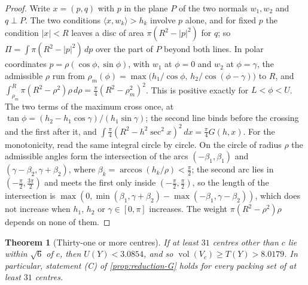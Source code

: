 \documentclass[11pt,reqno]{amsart}
\renewcommand{\_}{\origunderscore\allowbreak}
\numberwithin{equation}{section}
\theoremstyle{plain}
\newtheorem{thm}{Theorem}[section]
\theoremstyle{definition}
\theoremstyle{remark}
\DeclareMathOperator{\vol}{vol}
\begin{document}
\begin{proof}
Write $x=(p,q)$ with $p$ in the plane $P$ of the two normals $w_1,w_2$ and
$q\perp P$. The two conditions $\langle x,w_k\rangle>h_k$ involve $p$ alone,
and for fixed $p$ the condition $|x|<R$ leaves a disc of area
$\pi(R^2-|p|^2)$ for $q$; so $\Pi=\int\pi(R^2-|p|^2)\,dp$ over the part of
$P$ beyond both lines. In polar coordinates $p=\rho(\cos\phi,\sin\phi)$,
with $w_1$ at $\phi=0$ and $w_2$ at $\phi=\gamma$, the admissible $\rho$ run
from $\rho_m(\phi)=\max\bigl(h_1/\cos\phi,\,h_2/\cos(\phi-\gamma)\bigr)$ to
$R$, and $\int_{\rho_m}^R\pi(R^2-\rho^2)\rho\,d\rho=\frac\pi4(R^2-\rho_m^2)^2$.
This is positive exactly for $L<\phi<U$. The two terms of the maximum cross
once, at $\tan\phi=(h_2-h_1\cos\gamma)/(h_1\sin\gamma)$; the second line
binds before the crossing and the first after it, and
$\int\frac\pi4(R^2-h^2\sec^2x)^2\,dx=\frac\pi4G(h,x)$. For the monotonicity,
read the same integral circle by circle. On the circle of radius $\rho$ the
admissible angles form the intersection of the arcs
$(-\beta_1,\beta_1)$ and $(\gamma-\beta_2,\gamma+\beta_2)$, where
$\beta_k=\arccos(h_k/\rho)<\frac\pi2$; the second arc lies in
$(-\frac\pi2,\frac{3\pi}2)$ and meets the first only inside
$(-\frac\pi2,\frac\pi2)$, so the length of the intersection is
$\max(0,\min(\beta_1,\gamma+\beta_2)-\max(-\beta_1,\gamma-\beta_2))$, which
does not increase when $h_1$, $h_2$ or $\gamma\in[0,\pi]$ increases. The
weight $\pi(R^2-\rho^2)\rho$ depends on none of them.
\end{proof}

\begin{thm}[Thirty-one or more centres]\label{thm:count31}
If at least $31$ centres other than $c$ lie within $\sqrt6$ of $c$, then
$U(Y)<3.0854$, and so $\vol(V_c)\ge T(Y)>8.0179$. In particular, statement
(C) of \cref{prop:reduction-G} holds for every packing set of at least $31$
centres.
\end{thm}
\end{document}
